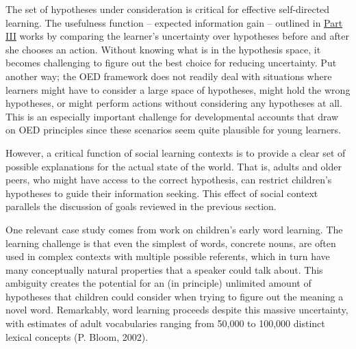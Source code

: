 \documentclass[english,floatsintext,man]{apa6}
\theoremstyle{definition}
\theoremstyle{definition}
\theoremstyle{definition}
\theoremstyle{remark}
\begin{document}
The set of hypotheses under consideration is critical for effective
self-directed learning. The usefulness function -- expected information
gain -- outlined in \protect\hyperlink{p3}{Part III} works by comparing
the learner's uncertainty over hypotheses before and after she chooses
an action. Without knowing what is in the hypothesis space, it becomes
challenging to figure out the best choice for reducing uncertainty. Put
another way; the OED framework does not readily deal with situations
where learners might have to consider a large space of hypotheses, might
hold the wrong hypotheses, or might perform actions without considering
any hypotheses at all. This is an especially important challenge for
developmental accounts that draw on OED principles since these scenarios
seem quite plausible for young learners.

However, a critical function of social learning contexts is to provide a
clear set of possible explanations for the actual state of the world.
That is, adults and older peers, who might have access to the correct
hypothesis, can restrict children's hypotheses to guide their
information seeking. This effect of social context parallels the
discussion of goals reviewed in the previous section.

One relevant case study comes from work on children's early word
learning. The learning challenge is that even the simplest of words,
concrete nouns, are often used in complex contexts with multiple
possible referents, which in turn have many conceptually natural
properties that a speaker could talk about. This ambiguity creates the
potential for an (in principle) unlimited amount of hypotheses that
children could consider when trying to figure out the meaning a novel
word. Remarkably, word learning proceeds despite this massive
uncertainty, with estimates of adult vocabularies ranging from 50,000 to
100,000 distinct lexical concepts (P. Bloom, 2002).
\end{document}
